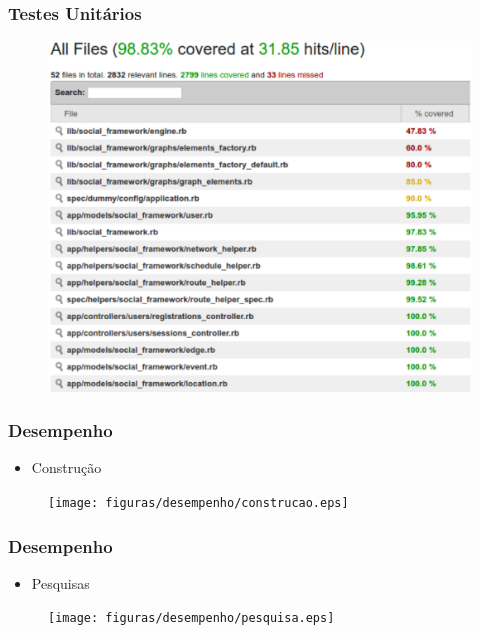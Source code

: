\documentclass{beamer}
\begin{document}
\begin{frame}
\frametitle{Testes Unitários}

\begin{figure}[h]
	\centering
	\includegraphics[scale=0.35]{figuras/cobertura.eps}
\end{figure}

\end{frame}

\begin{frame}
\frametitle{Desempenho}

\begin{itemize}
	\item{Construção}
\end{itemize}

\begin{figure}[h]
	\centering
	\texttt{[image: figuras/desempenho/construcao.eps]}
\end{figure}

\end{frame}

\begin{frame}
\frametitle{Desempenho}

\begin{itemize}
	\item{Pesquisas}
\end{itemize}

\begin{figure}[h]
	\centering
	\texttt{[image: figuras/desempenho/pesquisa.eps]}
\end{figure}

\end{frame}
\end{document}
